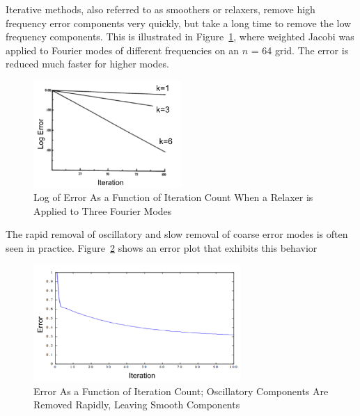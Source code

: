 Iterative methods, also referred to as smoothers or relaxers, remove high frequency error components very quickly, but take a long time to remove the low frequency components. This is illustrated in Figure~\ref{fig:FourierError}, where weighted Jacobi was applied to Fourier modes of different frequencies on an $n$ = 64 grid. The error is reduced much faster for higher modes. 
%
\begin{figure}[!ht]
    \begin{center}
      \includegraphics [width=0.5\textwidth, height=0.3\textheight] {FourierError}
   \end{center}
   \caption{Log of Error As a Function of Iteration Count When a Relaxer is Applied to Three Fourier Modes \cite{Briggs2000}}
   \label{fig:FourierError}
\end{figure}
%
The rapid removal of oscillatory and slow removal of coarse error modes is often seen in practice. Figure~\ref{fig:MGerrorExample} shows an error plot that exhibits this behavior
%
\begin{figure}[!ht]
    \begin{center}
      \includegraphics [width=0.7\textwidth, height=0.4\textheight] {MGerrorExample}
   \end{center}
   \caption{Error As a Function of Iteration Count; Oscillatory Components Are Removed Rapidly, Leaving Smooth Components \cite{Briggs2000}}
   \label{fig:MGerrorExample}
\end{figure}

